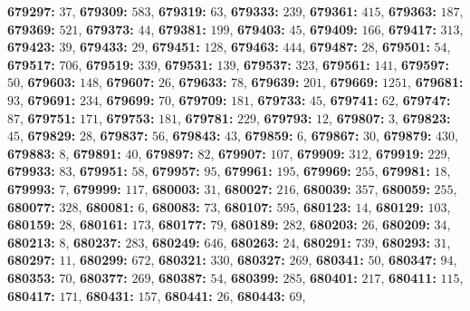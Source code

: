 \textsf{\bfseries 679297:} $37$, \textsf{\bfseries 679309:} $583$, \textsf{\bfseries 679319:} $63$, \textsf{\bfseries 679333:} $239$, \textsf{\bfseries 679361:} $415$, \textsf{\bfseries 679363:} $187$, \textsf{\bfseries 679369:} $521$, \textsf{\bfseries 679373:} $44$, \textsf{\bfseries 679381:} $199$, \textsf{\bfseries 679403:} $45$, \textsf{\bfseries 679409:} $166$, \textsf{\bfseries 679417:} $313$, \textsf{\bfseries 679423:} $39$, \textsf{\bfseries 679433:} $29$, \textsf{\bfseries 679451:} $128$, \textsf{\bfseries 679463:} $444$, \textsf{\bfseries 679487:} $28$, \textsf{\bfseries 679501:} $54$, \textsf{\bfseries 679517:} $706$, \textsf{\bfseries 679519:} $339$, \textsf{\bfseries 679531:} $139$, \textsf{\bfseries 679537:} $323$, \textsf{\bfseries 679561:} $141$, \textsf{\bfseries 679597:} $50$, \textsf{\bfseries 679603:} $148$, \textsf{\bfseries 679607:} $26$, \textsf{\bfseries 679633:} $78$, \textsf{\bfseries 679639:} $201$, \textsf{\bfseries 679669:} $1251$, \textsf{\bfseries 679681:} $93$, \textsf{\bfseries 679691:} $234$, \textsf{\bfseries 679699:} $70$, \textsf{\bfseries 679709:} $181$, \textsf{\bfseries 679733:} $45$, \textsf{\bfseries 679741:} $62$, \textsf{\bfseries 679747:} $87$, \textsf{\bfseries 679751:} $171$, \textsf{\bfseries 679753:} $181$, \textsf{\bfseries 679781:} $229$, \textsf{\bfseries 679793:} $12$, \textsf{\bfseries 679807:} $3$, \textsf{\bfseries 679823:} $45$, \textsf{\bfseries 679829:} $28$, \textsf{\bfseries 679837:} $56$, \textsf{\bfseries 679843:} $43$, \textsf{\bfseries 679859:} $6$, \textsf{\bfseries 679867:} $30$, \textsf{\bfseries 679879:} $430$, \textsf{\bfseries 679883:} $8$, \textsf{\bfseries 679891:} $40$, \textsf{\bfseries 679897:} $82$, \textsf{\bfseries 679907:} $107$, \textsf{\bfseries 679909:} $312$, \textsf{\bfseries 679919:} $229$, \textsf{\bfseries 679933:} $83$, \textsf{\bfseries 679951:} $58$, \textsf{\bfseries 679957:} $95$, \textsf{\bfseries 679961:} $195$, \textsf{\bfseries 679969:} $255$, \textsf{\bfseries 679981:} $18$, \textsf{\bfseries 679993:} $7$, \textsf{\bfseries 679999:} $117$, \textsf{\bfseries 680003:} $31$, \textsf{\bfseries 680027:} $216$, \textsf{\bfseries 680039:} $357$, \textsf{\bfseries 680059:} $255$, \textsf{\bfseries 680077:} $328$, \textsf{\bfseries 680081:} $6$, \textsf{\bfseries 680083:} $73$, \textsf{\bfseries 680107:} $595$, \textsf{\bfseries 680123:} $14$, \textsf{\bfseries 680129:} $103$, \textsf{\bfseries 680159:} $28$, \textsf{\bfseries 680161:} $173$, \textsf{\bfseries 680177:} $79$, \textsf{\bfseries 680189:} $282$, \textsf{\bfseries 680203:} $26$, \textsf{\bfseries 680209:} $34$, \textsf{\bfseries 680213:} $8$, \textsf{\bfseries 680237:} $283$, \textsf{\bfseries 680249:} $646$, \textsf{\bfseries 680263:} $24$, \textsf{\bfseries 680291:} $739$, \textsf{\bfseries 680293:} $31$, \textsf{\bfseries 680297:} $11$, \textsf{\bfseries 680299:} $672$, \textsf{\bfseries 680321:} $330$, \textsf{\bfseries 680327:} $269$, \textsf{\bfseries 680341:} $50$, \textsf{\bfseries 680347:} $94$, \textsf{\bfseries 680353:} $70$, \textsf{\bfseries 680377:} $269$, \textsf{\bfseries 680387:} $54$, \textsf{\bfseries 680399:} $285$, \textsf{\bfseries 680401:} $217$, \textsf{\bfseries 680411:} $115$, \textsf{\bfseries 680417:} $171$, \textsf{\bfseries 680431:} $157$, \textsf{\bfseries 680441:} $26$, \textsf{\bfseries 680443:} $69$, 
